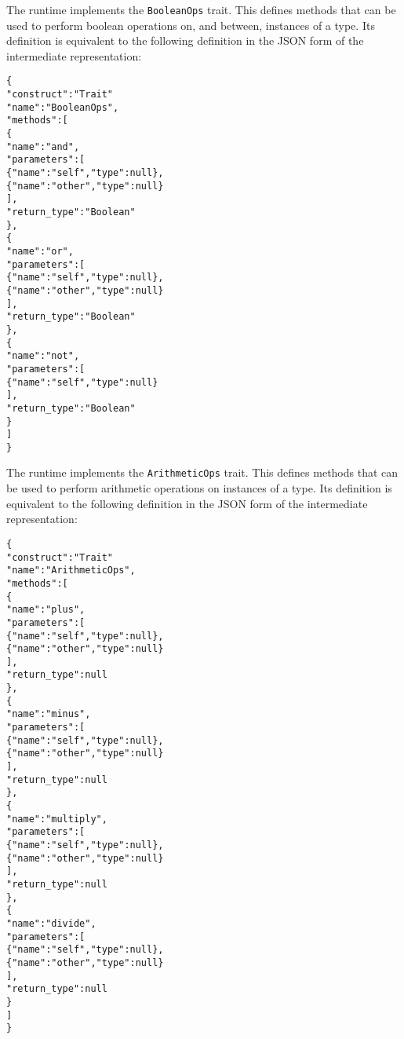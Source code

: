 \documentclass[10pt,twocolumn,a4paper]{article}
\newcommand{\code}[1]{\texttt{#1}}
\begin{document}
The runtime implements the \code{BooleanOps} trait. This defines methods
that can be used to perform boolean operations on, and between, instances
of a type.
Its definition is equivalent to the following definition in the JSON
form of the intermediate representation:
\footnotesize
\begin{alltt}
  \{
    "construct" : "Trait"
    "name"      : "BooleanOps",
    "methods"   : [
      \{
        "name"        : "and",
        "parameters"  : [
          \{"name" : "self",  "type"   : null\},
          \{"name" : "other", "type"   : null\}
        ],
        "return\_type" : "Boolean"
      \},
      \{
        "name"        : "or",
        "parameters"  : [
          \{"name" : "self",  "type"   : null\},
          \{"name" : "other", "type"   : null\}
        ],
        "return\_type" : "Boolean"
      \},
      \{
        "name"        : "not",
        "parameters"  : [
          \{"name" : "self",  "type"   : null\}
        ],
        "return\_type" : "Boolean"
      \}
    ]
  \}
\end{alltt}
\normalsize

The runtime implements the \code{ArithmeticOps} trait. This defines methods
that can be used to perform arithmetic operations on instances of a type.
Its definition is equivalent to the following definition in the JSON
form of the intermediate representation:
\footnotesize
\begin{alltt}
  \{
    "construct" : "Trait"
    "name"      : "ArithmeticOps",
    "methods"   : [
      \{
        "name"        : "plus",
        "parameters"  : [
          \{"name" : "self",  "type"   : null\},
          \{"name" : "other", "type"   : null\}
        ],
        "return\_type" : null
      \},
      \{
        "name"        : "minus",
        "parameters"  : [
          \{"name" : "self",  "type"   : null\},
          \{"name" : "other", "type"   : null\}
        ],
        "return\_type" : null
      \},
      \{
        "name"        : "multiply",
        "parameters"  : [
          \{"name" : "self",  "type"   : null\},
          \{"name" : "other", "type"   : null\}
        ],
        "return\_type" : null
      \},
      \{
        "name"        : "divide",
        "parameters"  : [
          \{"name" : "self",  "type"   : null\},
          \{"name" : "other", "type"   : null\}
        ],
        "return\_type" : null
      \}
    ]
  \}
\end{alltt}
\normalsize

\end{document}
